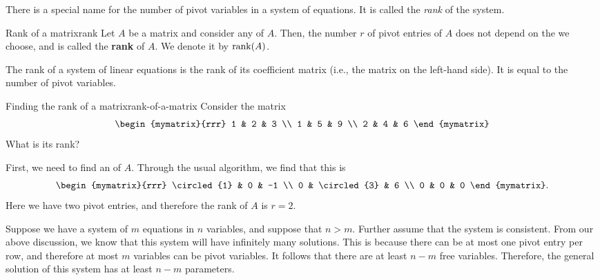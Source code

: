 There is a special name for the number of pivot variables in a system
of equations. It is called the {\em rank} of the system.

\begin{definition}{Rank of a matrix}{rank}
  Let $A$ be a matrix and consider any {\ef} of $A$.  Then, the number
  $r$ of pivot entries of $A$ does not depend on the {\ef} we choose,
  and is called the \textbf{rank} of
  $A$. We denote it by $\rank(A)$.

  The rank of a system of linear equations is the rank of its
  coefficient matrix (i.e., the matrix on the left-hand side).
  It is equal to the number of pivot variables.
\end{definition}

\begin{example}{Finding the rank of a matrix}{rank-of-a-matrix}
Consider the matrix
\begin{equation*}
\begin{mymatrix}{rrr}
1 & 2 & 3 \\
1 & 5 & 9 \\
2 & 4 & 6
\end{mymatrix}
\end{equation*}
What is its rank?
\end{example}

\begin{solution}
  First, we need to find an {\ef} of $A$. Through the usual algorithm,
  we find that this is
  \begin{equation*}
    \begin{mymatrix}{rrr}
      \circled{1} & 0 & -1 \\
      0 & \circled{3} & 6 \\
      0 & 0 & 0
    \end{mymatrix}.
  \end{equation*}
  Here we have two pivot entries, and therefore the rank of $A$ is
  $r=2$.
\end{solution}

Suppose we have a system of $m$ equations in $n$ variables, and
suppose that $n>m$. Further assume that the system is consistent. From
our above discussion, we know that this system will have infinitely
many solutions. This is because there can be at most one pivot entry
per row, and therefore at most $m$ variables can be pivot
variables. It follows that there are at least $n-m$ free variables.
Therefore, the general solution of this system has at least $n-m$
parameters.

